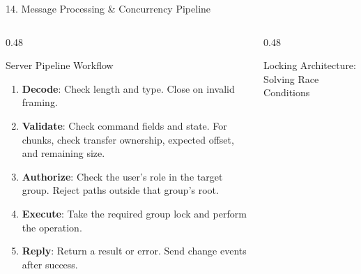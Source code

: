 \documentclass[t, aspectratio=169]{beamer}
\begin{document}
\begin{frame}{14. Message Processing \& Concurrency Pipeline}
\small
\begin{columns}[T]
\begin{column}{0.48\textwidth}
\begin{block}{Server Pipeline Workflow}
\scriptsize
\begin{enumerate}
    \setlength{\itemsep}{2pt}
    \item \textbf{Decode}: Check length and type. Close on invalid framing.
    \item \textbf{Validate}: Check command fields and state. For chunks, check transfer ownership, expected offset, and remaining size.
    \item \textbf{Authorize}: Check the user's role in the target group. Reject paths outside that group's root.
    \item \textbf{Execute}: Take the required group lock and perform the operation.
    \item \textbf{Reply}: Return a result or error. Send change events after success.
\end{enumerate}
\end{block}
\end{column}

\begin{column}{0.48\textwidth}
\begin{block}{Locking Architecture: Solving Race Conditions}
\centering
\vspace{1pt}
\end{block}
\end{column}
\end{columns}
\end{frame}
\end{document}
